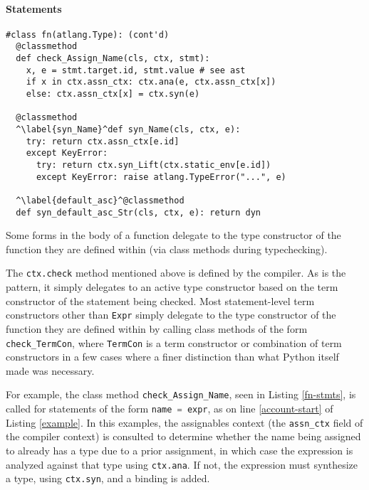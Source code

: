 \documentclass[9pt]{sigplanconf}
\newcommand{\lstinlinep}[1]{\lstinline[language=Python,basicstyle=\ttfamily\small,deletendkeywords={tuple,buffer,map}]{#1}}
\begin{document}
\paragraph{Statements}
\begin{codelisting}[t]
\begin{lstlisting}
#class fn(atlang.Type): (cont'd) 
  @classmethod
  def check_Assign_Name(cls, ctx, stmt):
    x, e = stmt.target.id, stmt.value # see ast
    if x in ctx.assn_ctx: ctx.ana(e, ctx.assn_ctx[x])
    else: ctx.assn_ctx[x] = ctx.syn(e)
    
  @classmethod
  ^\label{syn_Name}^def syn_Name(cls, ctx, e):
    try: return ctx.assn_ctx[e.id]
    except KeyError:
      try: return ctx.syn_Lift(ctx.static_env[e.id])
      except KeyError: raise atlang.TypeError("...", e)
  
  ^\label{default_asc}^@classmethod
  def syn_default_asc_Str(cls, ctx, e): return dyn
\end{lstlisting}
\caption{Some forms in the body of a function delegate to the type constructor of the function they are defined within (via class methods during typechecking).}
\label{fn-stmts}
\end{codelisting}
The \lstinlinep{ctx.check} method mentioned above is defined by the compiler. As is the pattern, it simply delegates to an active type constructor based on the term constructor of the statement being checked. Most statement-level term constructors other than \lstinlinep{Expr} simply delegate to the type constructor of the function they are defined within by calling class methods of the form \lstinlinep{check_TermCon}, where \lstinlinep{TermCon} is a term constructor or combination of term constructors in a few cases where a finer distinction than what Python itself made was necessary.

For example, the class method \lstinlinep{check_Assign_Name}, seen in Listing \ref{fn-stmts}, is called for statements of the form \lstinlinep{name = expr}, as on line \ref{account-start} of Listing \ref{example}. In this examples, the assignables context (the \lstinlinep{assn_ctx} field of the compiler context) is consulted to determine whether the name being assigned to already has a type due to a prior assignment, in which case the expression is analyzed against that type using \lstinlinep{ctx.ana}. If not, the expression must synthesize a type, using \lstinlinep{ctx.syn}, and a binding is added. %
\end{document}
